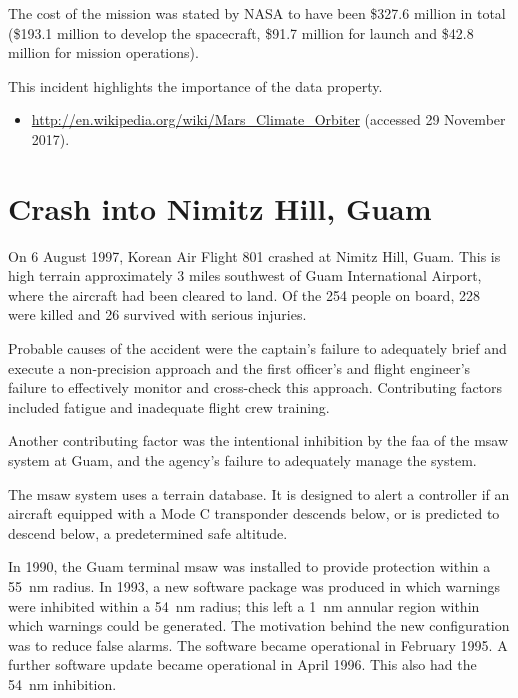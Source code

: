 The cost of the mission was stated by NASA to have been \$327.6 million in total (\$193.1 million to develop the spacecraft, \$91.7 million for launch and \$42.8 million for mission operations). 

This incident highlights the importance of the  \gls{data property}.

\begin{itemize}
  \item \raggedright{\href{http://en.wikipedia.org/wiki/Mars_Climate_Orbiter}{http://en.wikipedia.org/wiki/Mars\_Climate\_Orbiter} (accessed 29 November 2017).}
\end{itemize}


\section{Crash into Nimitz Hill, Guam \label{bkm:incacc:nimitzhill}}
On 6 August 1997, Korean Air Flight 801 crashed at Nimitz Hill, Guam. This is high terrain approximately 3 miles southwest of Guam International Airport, where the aircraft had been cleared to land. Of the 254 people on board, 228 were killed and 26 survived with serious injuries.

Probable causes of the accident were the captain's failure to adequately brief and execute a non-precision approach and the first officer's and flight engineer's failure to effectively monitor and cross-check this approach. Contributing factors included fatigue and inadequate flight crew training.

Another contributing factor was the intentional inhibition by the \gls{faa} of the \gls{msaw} system at Guam, and the agency's failure to adequately manage the system.

The \gls{msaw} system uses a terrain \gls{database}. It is designed to alert a controller if an aircraft equipped with a Mode C transponder descends below, or is predicted to descend below, a predetermined safe altitude.

In 1990, the Guam terminal \gls{msaw} was installed to provide protection within a 55~nm radius. In 1993, a new software package was produced in which warnings were inhibited within a 54~nm radius; this left a 1~nm annular region within which warnings could be generated. The motivation behind the new configuration was to reduce false alarms. The software became operational in February 1995. A further software update became operational in April 1996. This also had the 54~nm inhibition.

